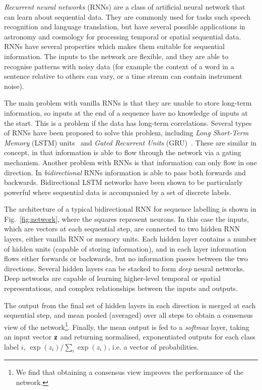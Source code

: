 \documentclass[twocolumn]{aastex61}
\begin{document}
{\em Recurrent neural networks} (RNNs) are a class of artificial neural network  that can learn about sequential data. They are commonly used for tasks such speech recognition and language translation, but have several possible applications in astronomy  and cosmology for processing temporal or spatial sequential data. RNNs have several properties which makes them suitable for sequential information. The inputs to the network are flexible, and they are able to recognise patterns with noisy data (for example the context of a word in a sentence relative to others can vary, or a time stream can contain instrument noise). 

The main problem with vanilla RNNs  is that they are unable to store long-term information, so inputs at the end of a sequence have no knowledge of inputs at the start. This is a problem if the data has long-term correlations. Several types of RNNs have been proposed to solve this problem, including {\em Long Short-Term Memory} (LSTM) units~\cite{LSTM} and {\em Gated Recurrent Units} (GRU)~\cite{2014arXiv1412.3555C}. These are similar in concept, in that information is able to flow through the network via a gating mechanism. Another problem with RNNs is that information can only flow in one direction. In {\em bidirectional} RNNs information is able to pass both forwards and backwards. Bidirectional LSTM networks have been shown to be particularly powerful where sequential data is accompanied by a set of discrete labels. 

The architecture of a typical bidirectional RNN for sequence labelling is shown in Fig.~\ref{fig:network}, where the squares represent {\rm neurons}. In this case the inputs, which are vectors at each sequential step, are connected to two hidden RNN layers, either vanilla RNN or memory units.  Each hidden layer contains a number of hidden units (capable of storing information), and in each layer information flows either forwards or backwards,  but no information passes between the two directions. Several hidden layers can be stacked to form {\em deep} neural networks. Deep networks are capable of learning higher-level temporal or spatial representations, and complex relationships between the inputs and outputs.

The output from the final set of hidden layers in each direction is merged at each sequential step, and mean pooled (averaged) over all steps to obtain a consensus view of the network\footnote{We find that obtaining a consensus view improves the performance of the network.}. Finally, the mean output is fed to a {\em softmax} layer, taking an input vector ${\bf z}$ and returning normalised, exponentiated outputs for each class label $i$, $\exp(z_i) / \sum_{i} \exp(z_i)$, i.e. a vector of probabilities.
\end{document}
